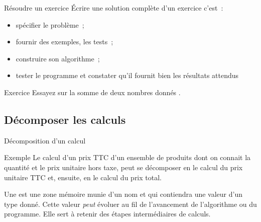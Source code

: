 \begin{frame}{Résoudre un exercice}
  Écrire une solution complète d'un exercice c'est~:
  \begin{itemize}
    \item spécifier le problème~;
    \item fournir des exemples, les tests~;
    \item construire son algorithme~;
    \item tester le programme et constater qu'il fournit bien les 
      résultats attendus
  \end{itemize}

  \pause
  \begin{block}{Exercice}
    Essayez sur \og la somme de deux nombres donnés \fg.
  \end{block}
\end{frame}

\subsection{Décomposer les calculs}
\begin{frame}{Décomposition d'un calcul}
  \begin{block}{Exemple}
    Le calcul d'un prix TTC d'un ensemble de produits dont on connait la
    quantité et le prix unitaire hors taxe, peut se décomposer en le calcul
    du prix unitaire TTC et, ensuite, en le calcul du prix total.
  \end{block}
\end{frame}

\begin{frame}
  \begin{definition}[Variable]
    Une  est une zone mémoire munie
    d'un nom et qui contiendra une valeur d’un type donné.  Cette valeur
    \emph{peut} évoluer au fil de l'avancement de l'algorithme ou du
    programme.  Elle sert à retenir des étapes intermédiaires de
    calculs.
  \end{definition}
\end{frame}

